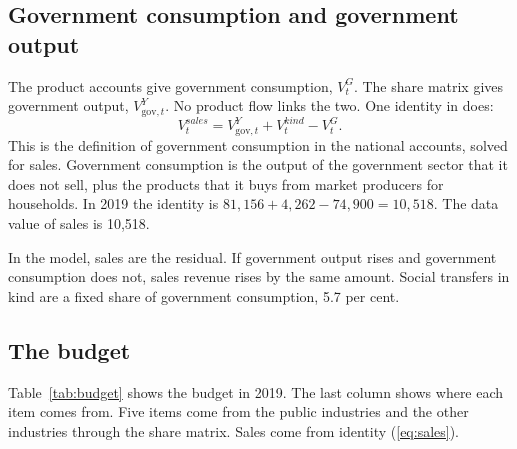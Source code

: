 \documentclass[11pt,a4paper]{article}
\newcommand{\code}[1]{\texttt{\detokenize{#1}}}
\newcommand{\gov}{\mathrm{gov}}
\begin{document}
\subsection{Government consumption and government output}

The product accounts give government consumption, $V^G_t$. The share matrix gives government output, $V^Y_{\gov,t}$.
No product flow links the two. One identity in \code{GovernmentRevenue} does:
\begin{equation}
V^{\mathit{sales}}_t = V^Y_{\gov,t} + V^{\mathit{kind}}_t - V^G_t .
\label{eq:sales}
\end{equation}
This is the definition of government consumption in the national accounts, solved for sales.
Government consumption is the output of the government sector that it does not sell, plus the products that it buys from market producers for households.
In 2019 the identity is $81{,}156 + 4{,}262 - 74{,}900 = 10{,}518$. The data value of sales is 10,518.

In the model, sales are the residual. If government output rises and government consumption does not, sales revenue rises by the same amount.
Social transfers in kind are a fixed share of government consumption, 5.7 per cent.

\subsection{The budget}

Table~\ref{tab:budget} shows the budget in 2019. The last column shows where each item comes from.
Five items come from the public industries and the other industries through the share matrix.
Sales come from identity (\ref{eq:sales}).
\end{document}
